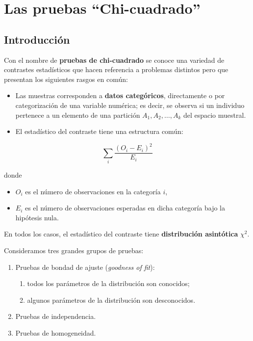 \documentclass[
]{article}
\providecommand{\tightlist}{%
  \setlength{\itemsep}{0pt}\setlength{\parskip}{0pt}}
\begin{document}
\newpage

\section{Las pruebas ``Chi-cuadrado''}\label{las-pruebas-chi-cuadrado}

\subsection{Introducción}\label{introducciuxf3n-8}

Con el nombre de \textbf{pruebas de chi-cuadrado} se conoce una variedad de contrastes estadísticos que hacen referencia a problemas distintos pero que presentan los siguientes rasgos en común:

\begin{itemize}
\tightlist
\item
  Las muestras corresponden a \textbf{datos categóricos}, directamente o por categorización de una variable numérica; es decir, se observa si un individuo pertenece a un elemento de una partición \(A_{1}, A_{2}, \ldots, A_{k}\) del espacio muestral.
\item
  El estadístico del contraste tiene una estructura común:
\end{itemize}

\[
\sum_{i} \frac{(O_i - E_i)^2}{E_i}
\]

donde

\begin{itemize}
\tightlist
\item
  \(O_i\) es el número de observaciones en la categoría \(i\),
\item
  \(E_i\) es el número de observaciones esperadas en dicha categoría bajo la hipótesis nula.
\end{itemize}

En todos los casos, el estadístico del contraste tiene \textbf{distribución asintótica} \(\chi^2\).

Consideramos tres grandes grupos de pruebas:

\begin{enumerate}
\def\labelenumi{\arabic{enumi}.}
\tightlist
\item
  Pruebas de bondad de ajuste (\emph{goodness of fit}):

  \begin{enumerate}
  \def\labelenumii{(\alph{enumii})}
  \tightlist
  \item
    todos los parámetros de la distribución son conocidos;\\
  \item
    algunos parámetros de la distribución son desconocidos.
  \end{enumerate}
\item
  Pruebas de independencia.
\item
  Pruebas de homogeneidad.
\end{enumerate}
\end{document}
